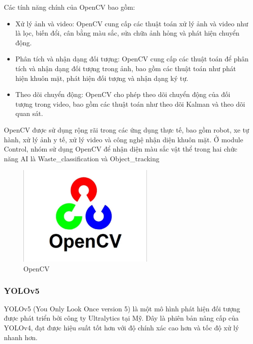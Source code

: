 Các tính năng chính của OpenCV bao gồm:
\begin{itemize}
    \item Xử lý ảnh và video: OpenCV cung cấp các thuật toán xử lý ảnh và video như là lọc, biến đổi, cân bằng màu sắc, sửa chữa ảnh hỏng và phát hiện chuyển động.
    \item Phân tích và nhận dạng đối tượng: OpenCV cung cấp các thuật toán để phân tích và nhận dạng đối tượng trong ảnh, bao gồm các thuật toán như phát hiện khuôn mặt, phát hiện đối tượng và nhận dạng ký tự.
    \item Theo dõi chuyển động: OpenCV cho phép theo dõi chuyển động của đối tượng trong video, bao gồm các thuật toán như theo dõi Kalman và theo dõi quan sát.
\end{itemize}
OpenCV được sử dụng rộng rãi trong các ứng dụng thực tế, bao gồm robot, xe tự hành, xử lý ảnh y tế, xử lý video và công nghệ nhận diện khuôn mặt. Ở module Control, nhóm sử dụng OpenCV để nhận diện màu sắc vật thể trong hai chức năng AI là Waste\_classification và Object\_tracking
\begin{figure}[!h]
    \centering
    \includegraphics[width=0.6\textwidth]{Images/Implementation/Control/opencv.jpg}
    \caption{OpenCV}
\end{figure}
\subsubsection{YOLOv5}
YOLOv5 (You Only Look Once version 5) là một mô hình phát hiện đối tượng được phát triển bởi công ty Ultralytics tại Mỹ. Đây là phiên bản nâng cấp của YOLOv4, đạt được hiệu suất tốt hơn với độ chính xác cao hơn và tốc độ xử lý nhanh hơn.

